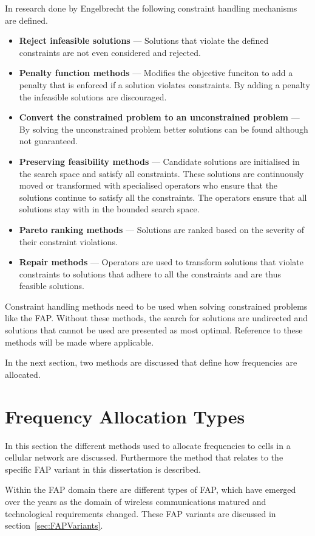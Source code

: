 In research done by Engelbrecht\cite{CompuIntelligenceIntro} the following constraint handling mechanisms are defined.
\begin{itemize}
\item{\textbf{Reject infeasible solutions}} --- Solutions that violate the defined constraints are not even considered and rejected.
\item{\textbf{Penalty function methods}} --- Modifies the objective funciton to add a penalty that is enforced if a solution violates constraints. By adding a penalty the infeasible solutions are discouraged.
\item{\textbf{Convert the constrained problem to an unconstrained problem}} --- By solving the unconstrained problem better solutions can be found although not guaranteed.
\item{\textbf{Preserving feasibility methods}} --- Candidate solutions are initialised in the search space and satisfy all constraints. These solutions are continuously moved or transformed with specialised operators who ensure that the solutions continue to satisfy all the constraints. The operators ensure that all solutions stay with in the bounded search space.
\item{\textbf{Pareto ranking methods}} --- Solutions are ranked based on the severity of their constraint violations.
\item{\textbf{Repair methods}} --- Operators are used to transform solutions that violate constraints to solutions that adhere to all the constraints and are thus feasible solutions.
\end{itemize}

Constraint handling methods need to be used when solving constrained problems like the \gls{FAP}. Without these methods, the search for solutions are undirected and solutions that cannot be used are presented as most optimal. Reference to these methods will be made where applicable.

In the next section, two methods are discussed that define how frequencies are allocated.
\section{Frequency Allocation Types}
\label{sec:FreqAssignmentTypes}
In this section the different methods used to allocate frequencies to cells in a cellular network are discussed. Furthermore the method that relates to the specific \gls{FAP} variant in this dissertation is described.

Within the \gls{FAP} domain there are different types of \gls{FAP}, which have emerged over the years as the domain of wireless communications matured and technological requirements changed. These \gls{FAP} variants are discussed in section~\ref{sec:FAPVariants}.

